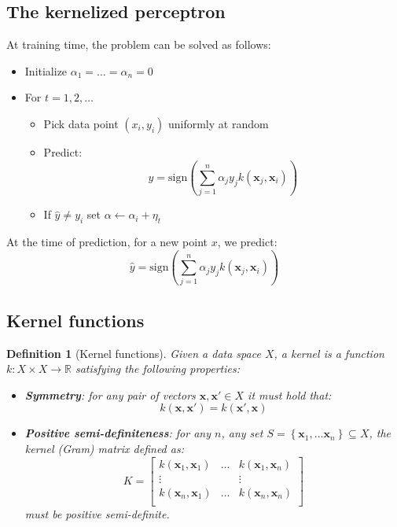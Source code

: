 \documentclass[a4paper,10pt,twoside]{article}
\newtheorem{definition}{Definition}[section]
\begin{document}
\subsection{The kernelized perceptron}  
At training time, the problem can be solved as follows:
\begin{itemize}
    \item Initialize $\alpha_1=\ldots=\alpha_n=0$
    \item For $t=1,2,\ldots$
    \begin{itemize}
        \item Pick data point $(x_i, y_i)$ uniformly at random
        \item Predict:
        \begin{equation*}
            \hat{y} = \text{sign}(\sum_{j=1}^{n}\alpha_jy_jk(\mathbf{x}_j, \mathbf{x}_i))
        \end{equation*}
        \item If $\hat{y}\neq y_i$ set $\alpha\leftarrow \alpha_i+\eta_t$
    \end{itemize}
\end{itemize}
At the time of prediction, for a new point $x$, we predict:
\begin{equation*}
    \hat{y} = \text{sign}(\sum_{j=1}^{n}\alpha_jy_jk(\mathbf{x}_j, \mathbf{x}_i))
\end{equation*}
\subsection{Kernel functions}
\begin{definition}[Kernel functions]
    Given a data space $X$, a kernel is a function $k:X\times X\rightarrow\mathbb{R}$ satisfying the following properties:
    \begin{itemize}
        \item \textbf{Symmetry}: for any pair of vectors $\mathbf{x}, \mathbf{x}'\in X$ it must hold that:
        \begin{equation*}
            k(\mathbf{x}, \mathbf{x}')=k(\mathbf{x}', \mathbf{x})
        \end{equation*}
        \item \textbf{Positive semi-definiteness}: for any $n$, any set $S=\left\{\mathbf{x}_1,\ldots\mathbf{x}_n\right\}\subseteq X$, the kernel (Gram) matrix defined as:
        \begin{equation*}
            K = \begin{bmatrix}
                k(\mathbf{x}_1, \mathbf{x}_1) & \ldots & k(\mathbf{x}_1, \mathbf{x}_n)\\
                \vdots & & \vdots\\
                k(\mathbf{x}_n, \mathbf{x}_1) & \ldots & k(\mathbf{x}_n, \mathbf{x}_n)\\
            \end{bmatrix}
        \end{equation*}
        must be positive semi-definite.
    \end{itemize}
\end{definition}
\end{document}
